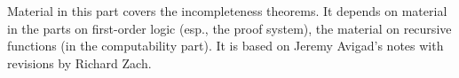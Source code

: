 \documentclass[../../include/open-logic-part]{subfiles}
\begin{document}

\begin{editorial}
 Material in this part covers the incompleteness theorems. It depends
 on material in the parts on first-order logic (esp., the proof
 system), the material on recursive functions (in the computability
 part).  It is based on Jeremy Avigad's notes with revisions by Richard Zach.
\end{editorial}






\OLEndPartHook
\end{document}
